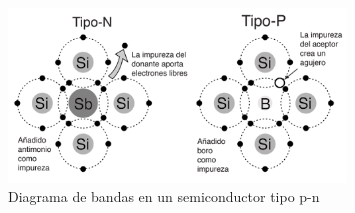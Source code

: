 \documentclass[
    10pt,
    aspectratio=169,
    xcolor={dvipsnames},
    spanish,
    ]{beamer}
\begin{document}
\begin{frame}
  \begin{figure}
    \centering
    \includegraphics[width=0.8\textwidth]{../figures/Auxiliar_2_13.png}
    \caption{Diagrama de bandas en un semiconductor tipo p-n}
  \label{fig:bandas_polarizacion}
\end{figure}
\end{frame}
\end{document}
